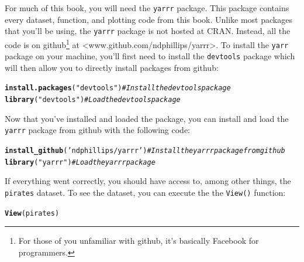 \documentclass{tufte-book}\usepackage[]{graphicx}\usepackage[]{color}
\makeatletter
\newcommand{\hlstr}[1]{\textcolor[rgb]{0.192,0.494,0.8}{#1}}%
\newcommand{\hlcom}[1]{\textcolor[rgb]{0.678,0.584,0.686}{\textit{#1}}}%
\newcommand{\hlstd}[1]{\textcolor[rgb]{0.345,0.345,0.345}{#1}}%
\newcommand{\hlkwd}[1]{\textcolor[rgb]{0.737,0.353,0.396}{\textbf{#1}}}%
\newenvironment{kframe}{%
 \def\at@end@of@kframe{}%
 \ifinner\ifhmode%
  \def\at@end@of@kframe{\end{minipage}}%
  \begin{minipage}{\columnwidth}%
 \fi\fi%
 \def\FrameCommand##1{\hskip\@totalleftmargin \hskip-\fboxsep
 \colorbox{shadecolor}{##1}\hskip-\fboxsep
     \hskip-\linewidth \hskip-\@totalleftmargin \hskip\columnwidth}%
 \MakeFramed {\advance\hsize-\width
   \@totalleftmargin\z@ \linewidth\hsize
   \@setminipage}}%
 {\par\unskip\endMakeFramed%
 \at@end@of@kframe}
\newenvironment{knitrout}{}{} %
\makeatother
\begin{document}
For much of this book, you will need the \texttt{yarrr} package. This package contains every dataset, function, and plotting code from this book. Unlike most packages that you'll be using, the \texttt{yarrr} package is not hosted at CRAN. Instead, all the code is on github\footnote{For those of you unfamiliar with github, it's basically Facebook for programmers.} at <www.github.com/ndphillips/yarrr>. To install the \texttt{yarr} package on your machine, you'll first need to install the \texttt{devtools} package which will then allow you to directly install packages from github:

\begin{knitrout}
\color{fgcolor}\begin{kframe}
\begin{alltt}
\hlkwd{install.packages}\hlstd{(}\hlstr{"devtools"}\hlstd{)} \hlcom{# Install the devtools package}
\hlkwd{library}\hlstd{(}\hlstr{"devtools"}\hlstd{)} \hlcom{# Load the devtools package}
\end{alltt}
\end{kframe}
\end{knitrout}

Now that you've installed and loaded the  package, you can install and load the \texttt{yarrr} package from github with the following code:

\begin{knitrout}
\color{fgcolor}\begin{kframe}
\begin{alltt}
\hlkwd{install_github}\hlstd{(}\hlstr{'ndphillips/yarrr'}\hlstd{)} \hlcom{# Install the yarrr package from github}
\hlkwd{library}\hlstd{(}\hlstr{"yarrr"}\hlstd{)} \hlcom{# Load the yarrr package}
\end{alltt}
\end{kframe}
\end{knitrout}






If everything went correctly, you should have access to, among other things, the \texttt{pirates} dataset. To see the dataset, you can execute the the \texttt{View()} function:

\begin{knitrout}
\color{fgcolor}\begin{kframe}
\begin{alltt}
\hlkwd{View}\hlstd{(pirates)}
\end{alltt}
\end{kframe}
\end{knitrout}
\end{document}
